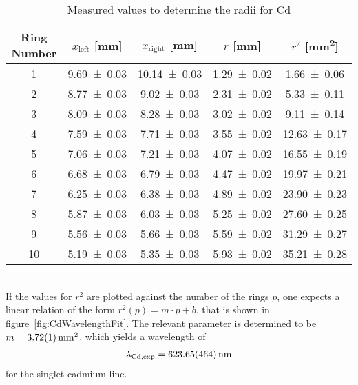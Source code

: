 \begin{table}[ht]
	\centering
	\begin{tabular}{c c c c c}
	Ring Number		& $x_\text{left}$ [\si{\mm}]	& $x_\text{right}$ [\si{\mm}]	& $r$ [\si{\mm}]		& $r^2$ [\si{\mm\squared}]	\\
	\hline
	1			& \num{9.69 \pm 0.03}		& \num{10.14 \pm 0.03}		& \num{1.29 \pm 0.02} 		& \num{1.66 \pm 0.06} \\
	2			& \num{8.77 \pm 0.03}		& \num{9.02 \pm 0.03}		& \num{2.31 \pm 0.02} 		& \num{5.33 \pm 0.11} \\
	3			& \num{8.09 \pm 0.03}		& \num{8.28 \pm 0.03}		& \num{3.02 \pm 0.02} 		& \num{9.11 \pm 0.14} \\
	4			& \num{7.59 \pm 0.03}		& \num{7.71 \pm 0.03}		& \num{3.55 \pm 0.02} 		& \num{12.63 \pm 0.17} \\
	5			& \num{7.06 \pm 0.03}		& \num{7.21 \pm 0.03}		& \num{4.07 \pm 0.02} 		& \num{16.55 \pm 0.19} \\
	6			& \num{6.68 \pm 0.03}		& \num{6.79 \pm 0.03}		& \num{4.47 \pm 0.02} 		& \num{19.97 \pm 0.21} \\
	7			& \num{6.25 \pm 0.03}		& \num{6.38 \pm 0.03}		& \num{4.89 \pm 0.02} 		& \num{23.90 \pm 0.23} \\
	8			& \num{5.87 \pm 0.03}		& \num{6.03 \pm 0.03}		& \num{5.25 \pm 0.02} 		& \num{27.60 \pm 0.25} \\
	9			& \num{5.56 \pm 0.03}		& \num{5.66 \pm 0.03}		& \num{5.59 \pm 0.02} 		& \num{31.29 \pm 0.27} \\
	10			& \num{5.19 \pm 0.03}		& \num{5.35 \pm 0.03}		& \num{5.93 \pm 0.02} 		& \num{35.21 \pm 0.28} \\
	\end{tabular}
	\caption[Measurement - Ring Positions Cd]{Measured values to determine the radii for Cd}
	\label{tab:CdRings}
\end{table}\\
If the values for $r^2$ are plotted against the number of the rings $p$, one expects a linear relation of the form $r^2(p) = m\cdot p + b$, that is shown in figure~\ref{fig:CdWavelengthFit}.
The relevant parameter is determined to be $m = \SI{3.72 \pm 0.01}{\mm\squared}$, which yields a wavelength of
\begin{align}
	\lambda_\text{Cd,exp} = \SI{623.65 \pm 4.64}{\nm}
\end{align}
for the singlet cadmium line. 
